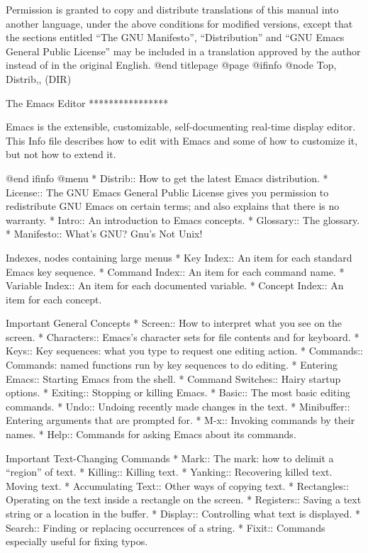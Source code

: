 Permission is granted to copy and distribute translations of this manual
into another language, under the above conditions for modified versions,
except that the sections entitled ``The GNU Manifesto'', ``Distribution''
and ``GNU Emacs General Public License'' may be included in a translation
approved by the author instead of in the original English.
@end titlepage
@page
@ifinfo
@node Top, Distrib,, (DIR)

The Emacs Editor
****************

Emacs is the extensible, customizable, self-documenting real-time
display editor.  This Info file describes how to edit with Emacs
and some of how to customize it, but not how to extend it.

@end ifinfo
@menu
* Distrib::     How to get the latest Emacs distribution.
* License::     The GNU Emacs General Public License gives you permission
		to redistribute GNU Emacs on certain terms; and also
		explains that there is no warranty.
* Intro::       An introduction to Emacs concepts.
* Glossary::    The glossary.
* Manifesto::   What's GNU?  Gnu's Not Unix!

Indexes, nodes containing large menus
* Key Index::      An item for each standard Emacs key sequence.
* Command Index::  An item for each command name.
* Variable Index:: An item for each documented variable.
* Concept Index::  An item for each concept.

Important General Concepts
* Screen::      How to interpret what you see on the screen.
* Characters::  Emacs's character sets for file contents and for keyboard.
* Keys::        Key sequences: what you type to request one editing action.
* Commands::    Commands: named functions run by key sequences to do editing.
* Entering Emacs::    Starting Emacs from the shell.
* Command Switches::  Hairy startup options.
* Exiting::     Stopping or killing Emacs.
* Basic::       The most basic editing commands.
* Undo::        Undoing recently made changes in the text.
* Minibuffer::  Entering arguments that are prompted for.
* M-x::         Invoking commands by their names.
* Help::        Commands for asking Emacs about its commands.

Important Text-Changing Commands
* Mark::        The mark: how to delimit a ``region'' of text.
* Killing::     Killing text.
* Yanking::     Recovering killed text.  Moving text.
* Accumulating Text::
                Other ways of copying text.
* Rectangles::  Operating on the text inside a rectangle on the screen.
* Registers::   Saving a text string or a location in the buffer.
* Display::     Controlling what text is displayed.
* Search::      Finding or replacing occurrences of a string.
* Fixit::       Commands especially useful for fixing typos.

